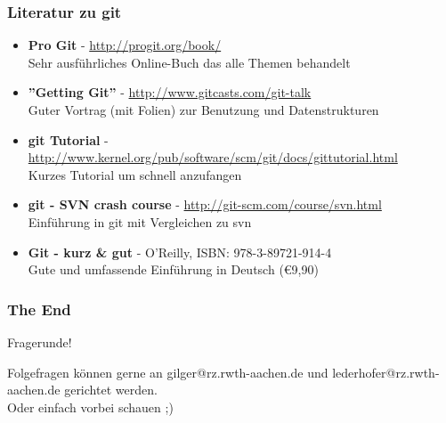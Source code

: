 \begin{frame}
  \frametitle{Literatur zu git}
  \begin{itemize}
    \item {\bf Pro Git} - \url{http://progit.org/book/} \\ Sehr ausführliches Online-Buch das alle Themen behandelt
    \item {\bf ''Getting Git''} - \url{http://www.gitcasts.com/git-talk} \\ Guter Vortrag (mit Folien) zur Benutzung und Datenstrukturen
    \item {\bf git Tutorial} - \url{http://www.kernel.org/pub/software/scm/git/docs/gittutorial.html} \\ Kurzes Tutorial um schnell anzufangen
    \item {\bf git - SVN crash course} - \url{http://git-scm.com/course/svn.html} \\ Einführung in git mit Vergleichen zu svn
    \item {\bf Git - kurz \& gut} - O'Reilly, ISBN: 978-3-89721-914-4 \\ Gute und umfassende Einführung in Deutsch (\euro{9,90}) 
  \end{itemize}
\end{frame}

\begin{frame}
  \frametitle{The End}
  \begin{center}
  \Huge Fragerunde!
  \vspace{1.5cm}

  \small Folgefragen können gerne an gilger@rz.rwth-aachen.de und lederhofer@rz.rwth-aachen.de gerichtet werden. \\
  Oder einfach vorbei schauen ;)
  \end{center}
\end{frame}


